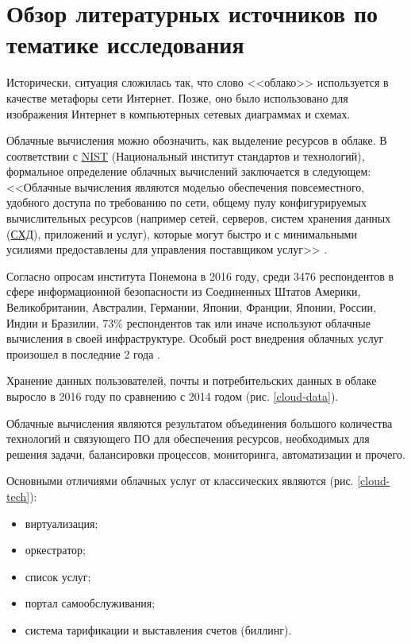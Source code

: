 \section{Обзор литературных источников по тематике исследования} \label{literature}

Исторически, ситуация сложилась так, что слово <<облако>> используется в качестве метафоры сети Интернет.
Позже, оно было использовано для изображения Интернет в компьютерных сетевых диаграммах и схемах.

Облачные вычисления можно обозначить, как выделение ресурсов в облаке.
В соответствии с \hyperlink{nist}{NIST} (Национальный институт стандартов и технологий), формальное определение облачных вычислений заключается в следующем:
<<Облачные вычисления являются моделью обеспечения повсеместного, удобного доступа по требованию по сети, общему пулу конфигурируемых вычислительных ресурсов (например сетей, серверов, систем хранения данных (\hyperlink{storage}{СХД}), приложений и услуг), которые могут быстро и с минимальными усилиями предоставлены для управления поставщиком услуг>> \cite{nist}.

Согласно опросам института Понемона в 2016 году, среди 3476 респондентов в сфере информационной безопасности из Соединенных Штатов Америки, Великобритании, Австралии, Германии, Японии, Франции, Японии, России, Индии и Бразилии, 73\% респондентов так или иначе используют облачные вычисления в своей инфраструктуре.
Особый рост внедрения облачных услуг произошел в последние 2 года \cite{gemalto}.

Хранение данных пользователей, почты и потребительских данных в облаке выросло в 2016 году по сравнению с 2014 годом (рис. \ref{cloud-data}).


Облачные вычисления являются результатом объединения большого количества технологий и связующего ПО для обеспечения ресурсов, необходимых для решения задачи, балансировки процессов, мониторинга, автоматизации и прочего.

Основными отличиями облачных услуг от классических являются (рис. \ref{cloud-tech}):
\begin{itemize}
  \item виртуализация;
  \item оркестратор;
  \item список услуг;
  \item портал самообслуживания;
  \item система тарификации и выставления счетов (биллинг).
\end{itemize}

